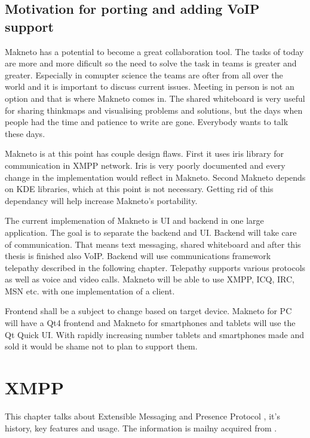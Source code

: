 

\section{Motivation for porting and adding VoIP support}
Makneto has a potential to become a great collaboration tool. The tasks of today are more and more dificult so the need to solve the task in teams is greater and greater. Especially in comupter science the teams are ofter from all over the world and it is important to discuss current issues. Meeting in person is not an option and that is where Makneto comes in. The shared whiteboard is very useful for sharing thinkmaps and visualising problems and solutions, but the days when people had the time and patience to write are gone. Everybody wants to talk these days.  

Makneto is at this point has couple design flaws. First it uses iris library for communication in XMPP network. Iris is very poorly documented and every change in the implementation would reflect in Makneto. Second Makneto depends on KDE libraries, which at this point is not necessary. Getting rid of this dependancy will help increase Makneto's portability. 

The current implemenation of Makneto is UI and backend in one large application. The goal is to separate the backend and UI. Backend will take care of communication. That means text messaging, shared whiteboard and after this thesis is finished also VoIP. Backend will use communications framework telepathy described in the following chapter. Telepathy supports various protocols as well as voice and video calls. Makneto will be able to use XMPP, ICQ, IRC, MSN etc. with one implementation of a client.

Frontend shall be a subject to change based on target device. Makneto for PC will have a Qt4 frontend and Makneto for smartphones and tablets will use the Qt Quick UI. With rapidly increasing number tablets and smartphones made and sold it would be shame not to plan to support them.  




\chapter{XMPP}
This chapter talks about Extensible Messaging and Presence Protocol \cite{xmpp}, it's history, key features and usage. The information is mailny acquired from \cite{xmppBook,xmppCoreRFC,xmppIMRFC}.

